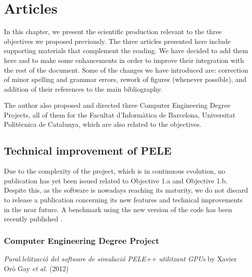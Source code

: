\chapter{Articles}
\label{chap:articles}


In this chapter, we present the scientific production relevant to the three objectives we proposed previously. The three articles presented here include supporting materials that complement the reading. We have decided to add them here and to make some enhancements in order to improve their integration with the rest of the document. Some of the changes we have introduced are: correction of minor spelling and grammar errors, rework of figures (whenever possible), and addition of their references to the main bibliography. 

The author also proposed and directed three Computer Engineering Degree Projects, all of them for the Facultat d'Inform\`atica de Barcelona, Universitat Polit\`ecnica de Catalunya, which are also related to the objectives. 

\section{Technical improvement of PELE}
Due to the complexity of the project, which is in continuous evolution, no publication has yet been issued related to Objective 1.a and Objective 1.b. Despite this, as the software is nowadays reaching its maturity, we do not discard to release a publication concerning its new features and technical improvements in the near future. A benchmark using the new version of the code has been recently published \cite{grebner_binding_2016}.

\subsection{Computer Engineering Degree Project}
\textit{Paral.lelitzaci\'o del software de simulaci\'o PELE++ utilitzant GPUs} by Xavier Or\`o Gay \textit{et al.} \cite{oro_gay_parallelitzacio_2012} (2012)

